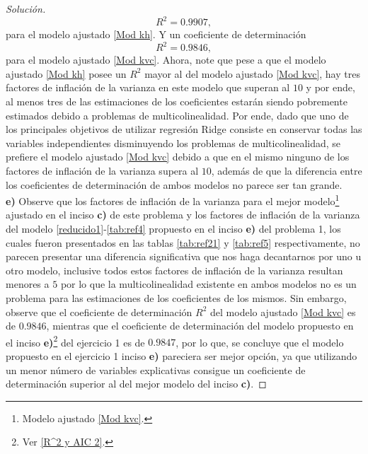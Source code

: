 \documentclass[10.5pt,notitlepage]{article}
\newenvironment{solucion}
  {\begin{proof}[Solución]}
  {\end{proof}}
\theoremstyle{plain}
\begin{document}
\begin{solucion}
\begin{equation}\label{R^2 1}
    R^2 = 0.9907,
\end{equation}
para el modelo ajustado \eqref{Mod kh}. Y un coeficiente de determinación 
\begin{equation}\label{R^2 2}
    R^2 = 0.9846, 
\end{equation}
para el modelo ajustado \eqref{Mod kvc}. Ahora, note que pese a que el modelo ajustado \eqref{Mod kh} posee un \(R^2\) mayor al del modelo ajustado \eqref{Mod kvc}, hay tres factores de inflación de la varianza en este modelo que superan al \(10\) y por ende, al menos tres de las estimaciones de los coeficientes estarán siendo pobremente estimados debido a problemas de multicolinealidad. Por ende, dado que uno de los principales objetivos de utilizar regresión Ridge consiste en conservar todas las variables independientes disminuyendo los problemas de multicolinealidad, se prefiere el modelo ajustado \eqref{Mod kvc} debido a que en el mismo ninguno de los factores de inflación de la varianza supera al \(10\), además de que la diferencia entre los coeficientes de determinación de ambos modelos no parece ser tan grande.\\

\noindent \textbf{e)} Observe que los factores de inflación de la varianza para el mejor modelo\footnote{Modelo ajustado \eqref{Mod kvc}.} ajustado en el inciso \textbf{c)} de este problema y los factores de inflación de la varianza del modelo \eqref{reducido1}-\eqref{tab:ref4} propuesto en el inciso \textbf{e)} del problema 1, los cuales fueron presentados en las tablas \ref{tab:ref21} y \ref{tab:ref5} respectivamente, no parecen presentar una diferencia significativa que nos haga decantarnos por uno u otro modelo, inclusive todos estos factores de inflación de la varianza resultan menores a \(5\) por lo que la multicolinealidad existente en ambos modelos no es un problema para las estimaciones de los coeficientes de los mismos. Sin embargo, observe que el coeficiente de determinación \(R^2\) del modelo ajustado \eqref{Mod kvc} es de \(0.9846\), mientras que el coeficiente de determinación del modelo propuesto en el inciso \textbf{e)}\footnote{Ver \eqref{R^2 y AIC 2}.} del ejercicio 1 es de \(0.9847\), por lo que, se concluye que el modelo propuesto en el ejercicio 1 inciso \textbf{e)} pareciera ser mejor opción, ya que utilizando un menor número de variables explicativas consigue un coeficiente de determinación superior al del mejor modelo del inciso \textbf{c)}.
\end{solucion}
\end{document}
